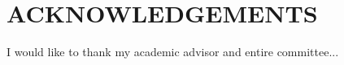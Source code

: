 %
%
\section*{\MakeUppercase{Acknowledgements}}

I would like to thank my academic advisor and entire committee...

\newpage